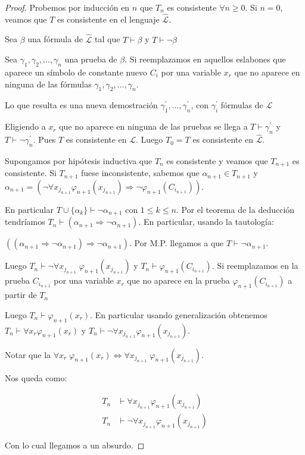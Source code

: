 
\begin{proof}
Probemos por inducci\'on en $n$ que $T_n$ es consistente $\forall n \geq 0$. Si $n = 0$, veamos que $T$ es consistente en el lenguaje $\hat{\mathcal{L}}$.
 
Sea $\beta$ una f\'ormula de $\hat{\mathcal{L}}$ tal que $T \vdash \beta$ y $T \vdash \neg \beta$ 
 
Sea $\gamma_1, \gamma_2, \ldots, \gamma_n$ una prueba de $\beta$. Si reemplazamos en aquellos eslabones que aparece un s\'imbolo de constante nuevo $C_i$ por una variable $x_r$ que no aparece en ninguna de las f\'ormulas $\gamma_1, \gamma_2, \ldots, \gamma_n$. 
 
Lo que resulta es una nueva demostraci\'on $\gamma^{'}_1, \ldots, \gamma^{'}_n$, con $\gamma^{'}_{i}$ f\'ormulas de $\mathcal{L}$ 
 
Eligiendo a $x_r$ que no aparece en ninguna de las pruebas se llega a $T \vdash \gamma^{'}_{n}$ y $T \vdash \neg \gamma^{'}_{n}$. Pues $T$ es consistente en $\mathcal{L}$. Luego $T_0 = T$ es consistente en $\hat{\mathcal{L}}$. 
 
Supongamos por hip\'otesis inductiva que $T_n$ es consistente y veamos que $T_{n + 1}$ es consistente. Si $T_{n + 1}$ fuese inconsistente, sabemos que $\alpha_{n + 1} \in T_{n + 1}$ y $\alpha_{n + 1} = (\neg \forall x_{j_{n + 1}} \varphi_{n + 1}(x_{j_{n + 1}}) \Rightarrow \neg  \varphi_{n + 1}(C_{i_{n + 1}}))$.
 
En particular $T \cup \{ \alpha_k \} \vdash \neg \alpha_{n + 1}$ con $1 \leq k \leq n$. Por el teorema de la deducci\'on tendr\'iamos $T_n \vdash (\alpha_{n + 1} \Rightarrow \neg \alpha_{n + 1})$. En particular, usando la tautolog\'ia:
 
$((\alpha_{n + 1} \Rightarrow \neg \alpha_{n + 1}) \Rightarrow \neg \alpha_{n + 1})$. Por M.P. llegamos a que $T \vdash \neg \alpha_{n + 1}$.
 
Luego $T_n \vdash \neg \forall x_{j_{n + 1}} \; \varphi_{n + 1}(x_{j_{n + 1}})$ y $T_n \vdash \varphi_{n + 1}(C_{i_{n + 1}})$. Si reemplazamos en la prueba $C_{i_{n + 1}}$ por una variable $x_r$ que no aparece en la prueba $\varphi_{n + 1}(C_{i_{n + 1}})$ a partir de $T_n$
 
Luego $T_{n} \vdash \varphi_{n + 1}(x_r)$. En particular usando generalizaci\'on obtenemos $T_n \vdash \forall x_r \varphi_{n + 1}(x_r)$ y $T_n \vdash \neg \forall x_{j_{n + 1}}\varphi_{n + 1}(x_{j_{n + 1}})$. 

Notar que la $\forall x_r \; \varphi_{n + 1}(x_r) \iff \forall x_{j_{n + 1}} \; \varphi_{n + 1}(x_{j_{n + 1}})$.
 
Nos queda como:
 
\begin{align*}
T_n &\vdash \forall x_{j_{n + 1}} \varphi_{n + 1}(x_{j_{n + 1}}) \\
T_n &\vdash \neg \forall x_{j_{n + 1}} \varphi_{n + 1}(x_{j_{n + 1}}) 
\end{align*}
 
Con lo cual llegamos a un absurdo.
\end{proof}
 
